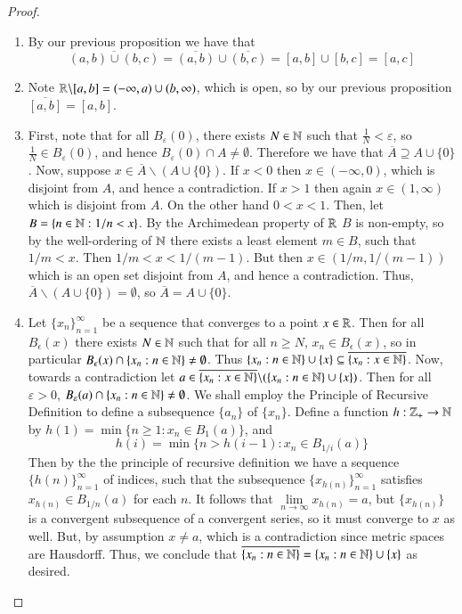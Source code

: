 \documentclass[12pt, a4paper, oneside, openright, titlepage]{book}
\begin{document}
\begin{example}
\begin{enumerate}
\begin{proof}
\begin{enumerate}
                    \item By our previous proposition we have that $$\overline{(a,b)\cup(b,c)} = \overline{(a,b)}\cup\overline{(b,c)} = [a,b]\cup[b,c] = [a,c]$$
                    \item Note $\mathbb R\backslash[a,b] = (-\infty,a)\cup(b,\infty)$, which is open, so by our previous proposition $\overline{[a,b]} = [a,b]$.
                    \item First, note that for all $B_{\varepsilon}(0)$, there exists $N \in \mathbb N$ such that $\frac{1}{N} < \varepsilon$, so $\frac{1}{N} \in B_{\varepsilon}(0)$, and hence $B_{\varepsilon}(0) \cap A \neq \emptyset.$ Therefore we have that $\overline{A} \supseteq A \cup \{0\}$. Now, suppose $x \in \overline{A}\backslash (A\cup\{0\})$. If $x < 0$ then $x \in (-\infty, 0)$, which is disjoint from $A$, and hence a contradiction. If $x > 1$ then again $x \in (1,\infty)$ which is disjoint from $A$. On the other hand $0 < x < 1$. Then, let $B = \{n \in \mathbb N: 1/n < x\}$. By the Archimedean property of $\mathbb R$ $B$ is non-empty, so by the well-ordering of $\mathbb N$ there exists a least element $m \in B$, such that $1/m < x$. Then $1/m < x < 1/(m-1)$. But then $x \in (1/m,1/(m-1))$ which is an open set disjoint from $A$, and hence a contradiction. Thus, $\overline{A}\backslash (A\cup\{0\}) = \emptyset$, so $\overline{A} = A\cup\{0\}$.
                    \item Let $\{x_n\}_{n=1}^{\infty}$ be a sequence that converges to a point $x \in \mathbb R$. Then for all $B_{\epsilon}(x)$ there exists $N \in \mathbb N$ such that for all $n \geq N$, $x_n \in B_{\epsilon}(x)$, so in particular $B_{\epsilon}(x) \cap \{x_n:n\in\mathbb N\} \neq \emptyset$. Thus $\{x_n:n\in\mathbb N\}\cup\{x\} \subseteq \overline{\{x_n:x\in\mathbb N\}}$. Now, towards a contradiction let $a \in \overline{\{x_n:x\in\mathbb N\}}\backslash (\{x_n:n\in\mathbb N\}\cup\{x\})$. Then for all $\varepsilon > 0$, $B_{\varepsilon}(a)\cap\{x_n:n\in\mathbb N\} \neq \emptyset$. We shall employ the Principle of Recursive Definition to define a subsequence $\{a_n\}$ of $\{x_n\}$. Define a function $h:\mathbb Z_+\rightarrow \mathbb N$ by $h(1) = \min\{n \geq 1: x_n \in B_1(a)\}$, and \begin{equation*}
                            h(i) = \min\{n>h(i-1):x_n \in B_{1/i}(a)\}
                    \end{equation*}
                        Then by the the principle of recursive definition we have a sequence $\{h(n)\}_{n=1}^{\infty}$ of indices, such that the subsequence $\{x_{h(n)}\}_{n=1}^{\infty}$ satisfies $x_{h(n)} \in B_{1/n}(a)$ for each $n$. It follows that $\lim\limits_{n\rightarrow \infty}x_{h(n)} = a$, but $\{x_{h(n)}\}$ is a convergent subsequence of a convergent series, so it must converge to $x$ as well. But, by assumption $x \neq a$, which is a contradiction since metric spaces are Hausdorff. Thus, we conclude that $\overline{\{x_n:n\in\mathbb N\}} = \{x_n:n\in\mathbb N\}\cup\{x\}$ as desired.

\end{enumerate}
\end{proof}
\end{enumerate}
\end{example}
\end{document}
